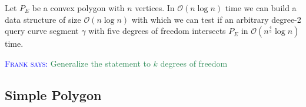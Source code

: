 \documentclass[UKenglish]{lipics-v2019}
\newcommand{\myremark}[4]{\textcolor{blue}{\textsc{#1 #2:}} \textcolor{#4}{\textsf{#3}}}
\newcommand{\frank}[2][says]{\myremark{Frank}{#1}{#2}{SeaGreen}}
\newcommand{\mkmcal}[1]{\ensuremath{\mathcal{#1}}\xspace}
\renewcommand{\O}{\mkmcal{O}}
\begin{document}
\begin{theorem}
  \label{thm:intersect_convex_polygon}
  Let $P_E$ be a convex polygon with $n$ vertices. In $\O(n\log n)$ time we can
  build a data structure of size $\O(n\log n)$ with which we can test if an
  arbitrary degree-2 query curve segment $\gamma$ with five degrees of freedom
  intersects $P_E$ in $\O(n^{\frac{4}{5}}\log n)$ time.
\end{theorem}
\frank{Generalize the statement to $k$ degrees of freedom}


\subsection{Simple Polygon}
\label{subsec:label}
\end{document}

